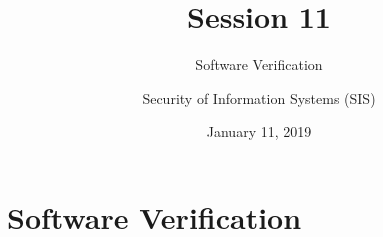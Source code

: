 \documentclass{curs}
\title[Session 11]{Session 11}
\subtitle{Software Verification}
\author{Security of Information Systems (SIS)}
\date{January 11, 2019}
\begin{document}
\frame{\titlepage}

\section{Software Verification}

% 
% 
% 
% 
% 
\end{document}
